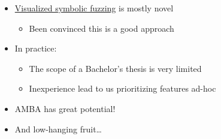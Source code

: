 \begin{frame}
	\begin{itemize}

		\item \underline{Visualized symbolic fuzzing} is mostly novel
		      \begin{itemize}
			      \item Been convinced this is a good approach
		      \end{itemize}

		\item In practice:
		      \begin{itemize}
			      \item The scope of a Bachelor's thesis is very limited
			      \item Inexperience lead to us prioritizing features ad-hoc
		      \end{itemize}

		\item AMBA has great potential!
		\item And low-hanging fruit\dots

	\end{itemize}
	\vfill
\end{frame}

